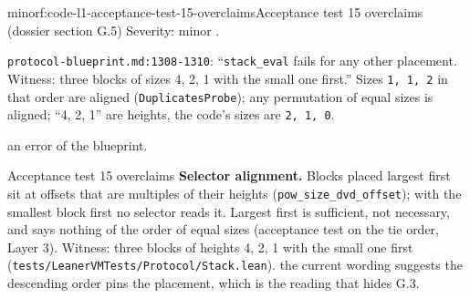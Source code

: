 \begin{finding}{minor}{f:code-l1-acceptance-test-15-overclaims}{Acceptance test 15 overclaims (dossier section G.5)}
Severity: minor .

\texttt{p\allowbreak{}r\allowbreak{}o\allowbreak{}t\allowbreak{}o\allowbreak{}c\allowbreak{}o\allowbreak{}l\allowbreak{}-{}\allowbreak{}b\allowbreak{}l\allowbreak{}u\allowbreak{}e\allowbreak{}p\allowbreak{}r\allowbreak{}i\allowbreak{}n\allowbreak{}t\allowbreak{}.\allowbreak{}m\allowbreak{}d\allowbreak{}:\allowbreak{}1\allowbreak{}3\allowbreak{}0\allowbreak{}8\allowbreak{}-{}\allowbreak{}1\allowbreak{}3\allowbreak{}1\allowbreak{}0}: \enquote{\texttt{stack\_\allowbreak{}eval} fails for any other placement. Witness: three blocks of sizes 4, 2, 1 with the small one first.} Sizes \texttt{1,\allowbreak{} 1,\allowbreak{} 2} in that order are aligned (\texttt{DuplicatesProbe}); any permutation of equal sizes is aligned; \enquote{4, 2, 1} are heights, the code's sizes are \texttt{2,\allowbreak{} 1,\allowbreak{} 0}.

an error of the blueprint.

\begin{change}{Acceptance test 15 overclaims}
\asproposed \textbf{Selector alignment.} Blocks placed largest first sit at offsets that are multiples of their heights (\texttt{pow\_\allowbreak{}size\_\allowbreak{}dvd\_\allowbreak{}offset}); with the smallest block first no selector reads it. Largest first is sufficient, not necessary, and says nothing of the order of equal sizes (acceptance test on the tie order, Layer 3). Witness: three blocks of heights 4, 2, 1 with the small one first (\texttt{t\allowbreak{}e\allowbreak{}s\allowbreak{}t\allowbreak{}s\allowbreak{}/\allowbreak{}L\allowbreak{}e\allowbreak{}a\allowbreak{}n\allowbreak{}e\allowbreak{}r\allowbreak{}V\allowbreak{}M\allowbreak{}T\allowbreak{}e\allowbreak{}s\allowbreak{}t\allowbreak{}s\allowbreak{}/\allowbreak{}P\allowbreak{}r\allowbreak{}o\allowbreak{}t\allowbreak{}o\allowbreak{}c\allowbreak{}o\allowbreak{}l\allowbreak{}/\allowbreak{}S\allowbreak{}t\allowbreak{}a\allowbreak{}c\allowbreak{}k\allowbreak{}.\allowbreak{}l\allowbreak{}e\allowbreak{}a\allowbreak{}n}).
\reason the current wording suggests the descending order pins the placement, which is the reading that hides G.3.
\end{change}

\end{finding}

